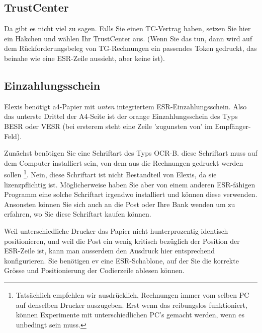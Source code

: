 \documentclass[a4paper]{scrartcl}
\begin{document}
\subsection{TrustCenter}
Da gibt es nicht viel zu sagen. Falls Sie einen TC-Vertrag haben, setzen Sie hier ein Häkchen und wählen Ihr TrustCenter aus. (Wenn Sie das tun, dann wird auf dem Rückforderungsbeleg von TG-Rechnungen ein passendes Token gedruckt, das beinahe wie eine ESR-Zeile aussieht, aber keine ist).

\subsection{Einzahlungsschein}
Elexis benötigt a4-Papier mit \textit{unten} integriertem ESR-Einzahlungsschein. Also das unterste Drittel der A4-Seite ist der orange Einzahlungsschein des Typs BESR oder VESR (bei ersterem steht eine Zeile 'zugunsten von' im Empfänger-Feld).

Zunächst benötigen Sie eine Schriftart des Typs OCR-B. diese Schriftart muss auf dem Computer installiert sein, von dem aus die Rechnungen gedruckt werden sollen \footnote{Tatsächlich empfehlen wir ausdrücklich, Rechnungen immer vom selben PC auf denselben Drucker auszugeben. Erst wenn das reibungslos funktioniert, können Experimente mit unterschiedlichen PC's gemacht werden, wenn es unbedingt sein muss.}. Nein, diese Schriftart ist nicht Bestandteil von Elexis, da sie lizenzpflichtig ist. Möglicherweise haben Sie aber von einem anderen ESR-fähigen Programm eine solche Schriftart irgendwo installiert und können diese verwenden. Ansonsten können Sie sich auch an die Post oder Ihre Bank wenden um zu erfahren, wo Sie diese Schriftart kaufen können.


Weil unterschiedliche Drucker das Papier nicht hunterprozentig identisch positionieren, und weil die Post ein wenig kritisch bezüglich der
Position der ESR-Zeile ist, kann man ausserdem den Ausdruck hier entsprechend konfigurieren. Sie benötigen ev eine ESR-Schablone, auf der Sie die korrekte Grösse und Positionierung der Codierzeile ablesen können.
\end{document}
